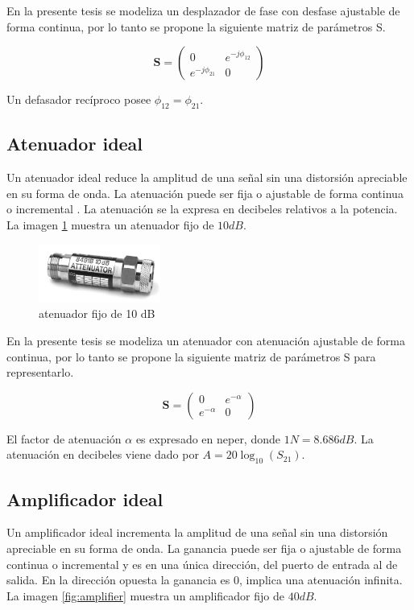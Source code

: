 En la presente tesis se modeliza un desplazador de fase con desfase ajustable de forma continua, por lo tanto se propone la 
siguiente matriz de parámetros S.

$$
\mathbf{S} = \begin{pmatrix} 0 & e^{-j\phi_{12}}\\e^{-j\phi_{21}} & 0\end{pmatrix}
$$

Un defasador recíproco posee $\phi_{12} = \phi_{21}$.

\subsection{Atenuador ideal}

Un atenuador ideal reduce la amplitud de una señal sin una distorsión apreciable en su forma de onda. La atenuación puede ser
fija o ajustable de forma continua o incremental \cite{Standard1996}. La atenuación se la expresa en decibeles relativos a la
potencia. La imagen \ref{fig:attenuator} muestra un atenuador fijo de $10 dB$.

\begin{figure}[H]
 \centering
 \includegraphics[width=4cm]{gfx/attenuator.png}
 \caption{atenuador fijo de 10 dB \cite{Keysight2014}}
 \label{fig:attenuator}
\end{figure}

En la presente tesis se modeliza un atenuador con atenuación ajustable de forma continua, por lo tanto se propone la siguiente
matriz de parámetros S para representarlo.

$$
\mathbf{S} = \begin{pmatrix} 0 & e^{-\alpha}\\e^{-\alpha} & 0\end{pmatrix}
$$

El factor de atenuación $\alpha$ es expresado en neper, donde $1N = 8.686dB$. La atenuación en decibeles viene dado por
$A = 20\log_{10}(S_{21})$. 


\subsection{Amplificador ideal}

Un amplificador ideal incrementa la amplitud de una señal sin una distorsión apreciable en su forma de onda. La ganancia puede
ser fija o ajustable de forma continua o incremental \cite{Standard1996} y es en una única dirección, del puerto de entrada al
de salida. En la dirección opuesta la ganancia es 0, implica una atenuación infinita. La imagen \ref{fig:amplifier} muestra un
amplificador fijo de $40 dB$.

